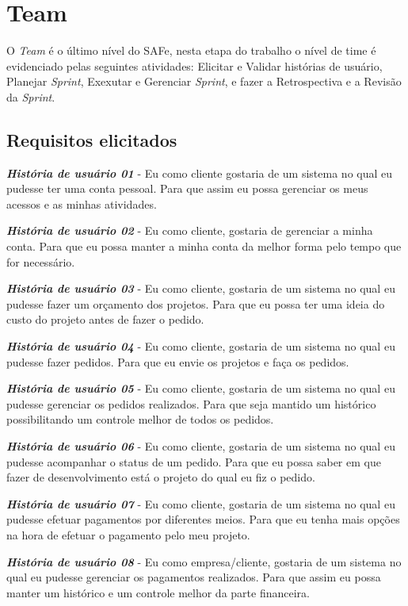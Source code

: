 \section{Team}
O \textit{Team} é o último nível do SAFe, nesta etapa do trabalho o nível de time é evidenciado pelas seguintes atividades: Elicitar e Validar histórias de usuário, Planejar \textit{Sprint}, Exexutar e Gerenciar \textit{Sprint}, e fazer a Retrospectiva e a Revisão da \textit{Sprint}.
\subsection{Requisitos elicitados}
\textbf{\textit{História de usuário 01}} - Eu como cliente gostaria de um sistema no qual eu pudesse ter uma conta pessoal. Para que assim eu possa gerenciar os meus acessos e as minhas atividades.

\textbf{\textit{História de usuário 02}} - Eu como cliente, gostaria de gerenciar a minha conta. Para que eu possa manter a minha conta da melhor forma pelo tempo que for necessário.

\textbf{\textit{História de usuário 03}} - Eu como cliente, gostaria de um sistema no qual eu pudesse fazer um orçamento dos projetos. Para que eu possa ter uma ideia do custo do projeto antes de fazer o pedido.

\textbf{\textit{História de usuário 04}} - Eu como cliente, gostaria de um sistema no qual eu pudesse fazer pedidos. Para que eu envie os projetos e faça os pedidos.

\textbf{\textit{História de usuário 05}} - Eu como cliente, gostaria de um sistema no qual eu pudesse gerenciar os pedidos realizados. Para que seja mantido um histórico possibilitando um controle melhor de todos os pedidos.

\textbf{\textit{História de usuário 06}} - Eu como cliente, gostaria de um sistema no qual eu pudesse acompanhar o status de um pedido. Para que eu possa saber em que fazer de desenvolvimento está o projeto do qual eu fiz o pedido.

\textbf{\textit{História de usuário 07}} - Eu como cliente, gostaria de um sistema no qual eu pudesse efetuar pagamentos por diferentes meios. Para que eu tenha mais opções na hora de efetuar o pagamento pelo meu projeto.

\textbf{\textit{História de usuário 08}} - Eu como empresa/cliente, gostaria de um sistema no qual eu pudesse gerenciar os pagamentos realizados. Para que assim eu possa manter um histórico e um controle melhor da parte financeira.

